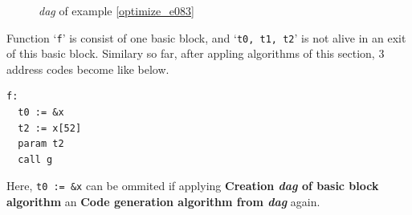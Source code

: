 \begin{Example}
\begin{figure}[htbp]
\begin{center}
\begin{latexonly}
\end{latexonly}
\caption{{\em dag} of example \ref{optimize_e083}}
\label{optimize_e084}
\end{center}
\end{figure}
Function `{\tt{f}}' is consist of one basic block,
and `{\tt{t0, t1, t2}}' is not alive in an exit of this basic block.
Similary so far, 
after appling algorithms of this section,
3 address codes become like below.
\begin{verbatim}
f:
  t0 := &x
  t2 := x[52]
  param t2
  call g
\end{verbatim}
Here, {\tt{t0 := \&x}} can be ommited if 
applying {\bf Creation {\em dag} of basic block algorithm} an
{\bf Code generation algorithm from {\em dag}} again.
\end{Example}

\begin{Example}
\label{optimize_e075}
\begin{verbatim}


\end{verbatim}
\end{Example}

